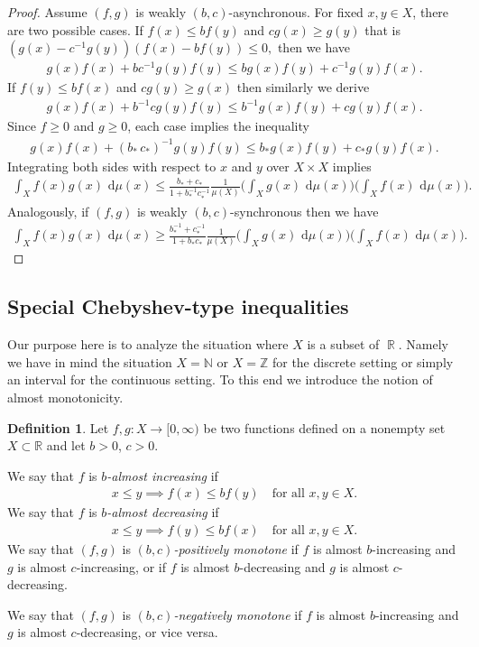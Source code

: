 \documentclass[12pt, reqno]{amsart}%
\theoremstyle{plain}  %
\theoremstyle{definition}  %
\newtheorem{definition}[theorem]{Definition}
\theoremstyle{remark}
\numberwithin{equation}{section}
\DeclareMathOperator{\R}{\mathbb{R}}
\renewcommand{\d}{\,\mathrm{d}}
\begin{document}
\begin{proof}
Assume $(f,g)$ is weakly $(b,c)$-asynchronous. For fixed $x, y \in X$, there are two possible cases. If $f(x) \leq b f(y)$  and $cg(x) \geq g(y)$ that is $(g(x) - c^{-1} g(y))(f(x) - b f(y)) \leq 0,$
then we have
\begin{align*}
g(x)f(x) + b c^{-1} g(y)f(y) \leq bg(x)f(y) +  c^{-1} g(y)f(x).
\end{align*}
If $f(y) \leq b f(x)$ and $cg(y) \geq g(x)$ then  similarly we derive
\begin{align*}
g(x)f(x) + b^{-1} c g(y)f(y) \leq b^{-1} g(x)f(y) +  c g(y)f(x).
\end{align*}
Since $f\geq 0$ and $g\geq 0$, each  case implies the  inequality
\begin{align*}
g(x)f(x)+(b_{*}\,c_{*})^{-1}g(y)f(y)\leq b_{*} g(x)f(y)+c_{*}g(y)f(x).
\end{align*}
Integrating both sides with respect to $x$ and $y$ over $X \times X$ implies
\begin{align*}
\int_X f(x) g(x)\,\d\mu(x) \leq \frac{b_{*}+c_{*}}{1+b^{-1}_{*}c^{-1}_{*}}\frac{1}{\mu(X)} \Big(\int_X g(x)\,\d\mu(x)\Big)\Big(\int_X f(x)\,\d\mu(x)\Big).
\end{align*}
Analogously, if $(f,g)$ is weakly $(b,c)$-synchronous then we have
\begin{align*}
\int_X f(x) g(x)\,\d\mu(x) \geq \frac{b^{-1}_{*}+c^{-1}_{*}}{1+b_{*}c_{*}}\frac{1}{\mu(X)}\Big(\int_X g(x)\,\d\mu(x)\Big)\Big(\int_X f(x)\,\d\mu(x)\Big).
\end{align*}
\end{proof}

\subsection{Special Chebyshev-type inequalities} Our purpose here is to analyze the situation where $X$ is a subset of $\R$. Namely we have in mind the situation $X=\mathbb{N}$ or $X=\mathbb{Z}$ for the discrete setting or simply an interval for the continuous setting. To this end we introduce the notion of almost monotonicity.
\begin{definition}
Let  $f,g: X \to [0,\infty)$ be two functions defined on a nonempty set $X \subset \mathbb{R}$ and let $b>0$, $c>0$.

\noindent We say that $f$ is \emph{$b$-almost increasing} if
\begin{align*}
x \leq y \implies f(x) \leq bf(y) \quad \text{for all } x, y \in X.
\end{align*}
\noindent We say that $f$ is \emph{$b$-almost decreasing} if
\begin{align*}
x \leq y \implies  f(y) \leq bf(x) \quad \text{for all } x, y \in X.
\end{align*}
\noindent We say that $(f,g)$ is \emph{$(b,c)$-positively monotone} if $f$ is almost $b$-increasing and $g$ is almost $c$-increasing, or if $f$ is almost $b$-decreasing and $g$ is almost $c$-decreasing.

\noindent We say that $(f,g)$ is \emph{$(b,c)$-negatively monotone} if $f$ is almost $b$-increasing and $g$ is almost $c$-decreasing, or vice versa.
\end{definition}
\end{document}
